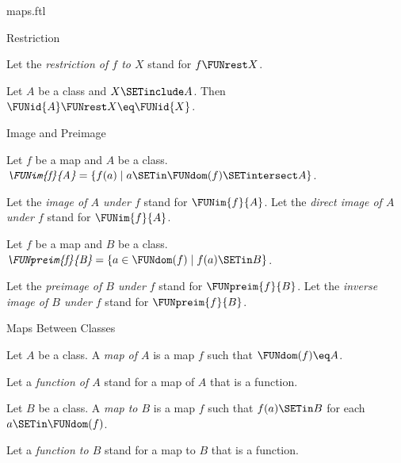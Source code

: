 \documentclass{naproche-library}
\begin{document}
\begin{smodule}[title=Maps]{maps.ftl}
\begin{sfragment}{Restriction}
\begin{definition}[forthel,id=FOUNDATIONS_06_7095412741636096]
    Let the \emph{restriction of $f$ to $X$} stand for $f \FUNrest X$.
  \end{definition}

  \begin{proposition}[forthel,id=FOUNDATIONS_06_2170189258948608]
    Let $A$ be a class and $X \SETinclude A$.
    Then $\FUNid{A} \FUNrest X \eq \FUNid{X}$.
  \end{proposition}
\end{sfragment}

\begin{sfragment}{Image and Preimage}
  \begin{definition}[forthel,id=FOUNDATIONS_06_3038237683613696]
    Let $f$ be a map and $A$ be a class.
    $\emph{\FUNim{f}{A}} = \{ f(a) \mid a \SETin \FUNdom(f) \SETintersect A \}$.

    Let the \emph{image of $A$ under $f$} stand for $\FUNim{f}{A}$.
    Let the \emph{direct image of $A$ under $f$} stand for $\FUNim{f}{A}$.
  \end{definition}

  \begin{definition}[forthel,id=FOUNDATIONS_06_4563167805964288]
    Let $f$ be a map and $B$ be a class.
    $\emph{\FUNpreim{f}{B}} = \{ a \in \FUNdom(f) \mid f(a) \SETin B \}$.

    Let the \emph{preimage of $B$ under $f$} stand for $\FUNpreim{f}{B}$.
    Let the \emph{inverse image of $B$ under $f$} stand for $\FUNpreim{f}{B}$.
  \end{definition}
\end{sfragment}

\begin{sfragment}{Maps Between Classes}
  \begin{definition}[forthel,id=FOUNDATIONS_06_6934038600220672]
    Let $A$ be a class.
    A \emph{map of $A$} is a map $f$ such that $\FUNdom(f) \eq A$.

    Let a \emph{function of $A$} stand for a map of $A$ that is a function.
  \end{definition}

  \begin{definition}[forthel,id=FOUNDATIONS_06_7725375157174272]
    Let $B$ be a class.
    A \emph{map to $B$} is a map $f$ such that $f(a) \SETin B$ for each $a \SETin \FUNdom(f)$.

    Let a \emph{function to $B$} stand for a map to $B$ that is a function.
  \end{definition}


\end{sfragment}
\end{smodule}
\end{document}
